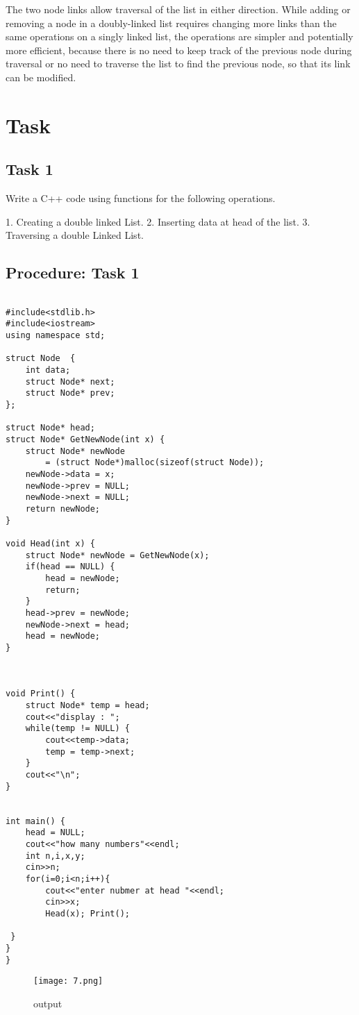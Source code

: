 \documentclass[11pt]{article}            %
\begin{document}
The two node links allow traversal of the list in either direction. While adding or removing a node in a doubly-linked list requires changing more links than the same operations on a singly linked list, the operations are simpler and potentially more efficient, because there is no need to keep track of the previous node during traversal or no need to traverse the list to find the previous node, so that its link can be modified.

\section{Task}  

\subsection{ Task 1 }     


Write a C++ code using functions for the following operations. 
 
1. 
Creating a double linked List. 
2. 
Inserting data at head of the list. 
3. 
Traversing a double Linked List. 
 

\subsection{Procedure: Task 1 }    
 

\begin{lstlisting}

#include<stdlib.h>
#include<iostream>
using namespace std;

struct Node  {
	int data;
	struct Node* next;
	struct Node* prev;
};

struct Node* head; 
struct Node* GetNewNode(int x) {
	struct Node* newNode
		= (struct Node*)malloc(sizeof(struct Node));
	newNode->data = x;
	newNode->prev = NULL;
	newNode->next = NULL;
	return newNode;
}

void Head(int x) {
	struct Node* newNode = GetNewNode(x);
	if(head == NULL) {
		head = newNode;
		return;
	}
	head->prev = newNode;
	newNode->next = head; 
	head = newNode;
}



void Print() {
	struct Node* temp = head;
	cout<<"display : ";
	while(temp != NULL) {
		cout<<temp->data;
		temp = temp->next;
	}
	cout<<"\n";
}


int main() {
	head = NULL; 
	cout<<"how many numbers"<<endl;
	int n,i,x,y;
	cin>>n;
	for(i=0;i<n;i++){
		cout<<"enter nubmer at head "<<endl;
		cin>>x;
	    Head(x); Print();

 }
}
}
\end{lstlisting}



\begin{figure*}
\centering
  \texttt{[image: 7.png]}
\caption{output}
\label{Figure:3}    
\end{figure*}

 
\end{document}
